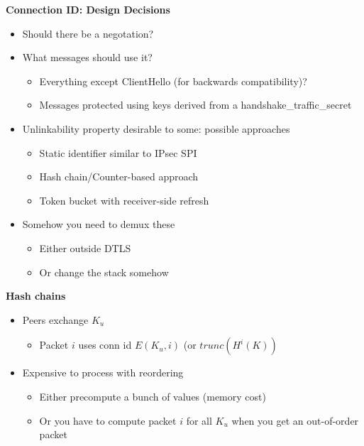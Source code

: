 \documentclass[helvetica]{seminar}
\newcommand{\heading}[1]{%
  \begin{center} 
    \large\bf 
    #1 
  \end{center} 
  \vspace{.4 in}}
\begin{document}
\begin{slide}
\heading{Connection ID: Design Decisions}

\vspace{-3ex}
\begin{itemize} 
\item Should there be a negotation?
\item What messages should use it?  
  \begin{itemize} 
  \item Everything except ClientHello (for backwards compatibility)?
  \item Messages protected using keys derived from a handshake\_traffic\_secret 
  \end{itemize} 

\item Unlinkability property desirable to some: possible approaches

  \begin{itemize} 
  \item Static identifier similar to IPsec SPI
  \item Hash chain/Counter-based approach
  \item Token bucket with receiver-side refresh
  \end{itemize} 

\item Somehow you need to demux these
  \begin{itemize} 
  \item Either outside DTLS
  \item Or change the stack somehow
  \end{itemize} 
\end{itemize} 
\end{slide}

\begin{slide}
\heading{Hash chains}

\begin{itemize}
\item Peers exchange $K_u$
  \begin{itemize}
  \item Packet $i$ uses conn id $E(K_u, i)$ (or $trunc(H^i(K))$
  \end{itemize}

\item Expensive to process with reordering
  \begin{itemize}
  \item Either precompute a bunch of values (memory cost)
  \item Or you have to compute packet $i$ for all $K_u$ when you get an out-of-order packet
  \end{itemize}
\end{itemize}
\end{slide}
\end{document}
